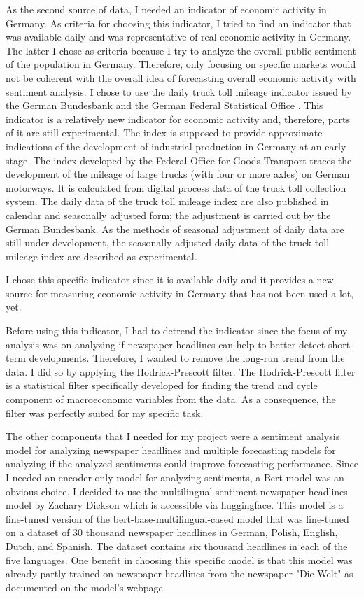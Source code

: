\documentclass[11pt, a4paper, leqno]{article}
\begin{document}
As the second source of data, I needed an indicator of economic activity in Germany. As criteria for choosing this indicator, I tried to find an indicator that was available daily and was representative of real economic activity in Germany. The latter I chose as criteria because I try to analyze the overall public sentiment of the population in Germany. Therefore, only focusing on specific markets would not be coherent with the overall idea of forecasting overall economic activity with sentiment analysis.
I chose to use the daily truck toll mileage indicator issued by the German Bundesbank and the German Federal Statistical Office \parencite{Destatis2024}. This indicator is a relatively new indicator for economic activity and, therefore, parts of it are still experimental. The index is supposed to provide approximate indications of the development of industrial production in Germany at an early stage. The index developed by the Federal Office for Goods Transport traces the development of the mileage of large trucks (with four or more axles) on German motorways. It is calculated from digital process data of the truck toll collection system. The daily data of the truck toll mileage index are also published in calendar and seasonally adjusted form; the adjustment is carried out by the German Bundesbank. As the methods of seasonal adjustment of daily data are still under development, the seasonally adjusted daily data of the truck toll mileage index are described as experimental.

I chose this specific indicator since it is available daily and it provides a new source for measuring economic activity in Germany that has not been used a lot, yet.

Before using this indicator, I had to detrend the indicator since the focus of my analysis was on analyzing if newspaper headlines can help to better detect short-term developments. Therefore, I wanted to remove the long-run trend from the data. I did so by applying the Hodrick-Prescott filter. The Hodrick-Prescott filter is a statistical filter specifically developed for finding the trend and cycle component of macroeconomic variables from the data. As a consequence, the filter was perfectly suited for my specific task.

The other components that I needed for my project were a sentiment analysis model for analyzing newspaper headlines and multiple forecasting models for analyzing if the analyzed sentiments could improve forecasting performance. Since I needed an encoder-only model for analyzing sentiments, a Bert model was an obvious choice. I decided to use the multilingual-sentiment-newspaper-headlines model by Zachary Dickson which is accessible via huggingface. This model is a fine-tuned version of the bert-base-multilingual-cased model that was fine-tuned on a dataset of 30 thousand newspaper headlines in German, Polish, English, Dutch, and Spanish. The dataset contains six thousand headlines in each of the five languages.
One benefit in choosing this specific model is that this model was already partly trained on newspaper headlines from the newspaper "Die Welt" as documented on the model's webpage.
\end{document}
